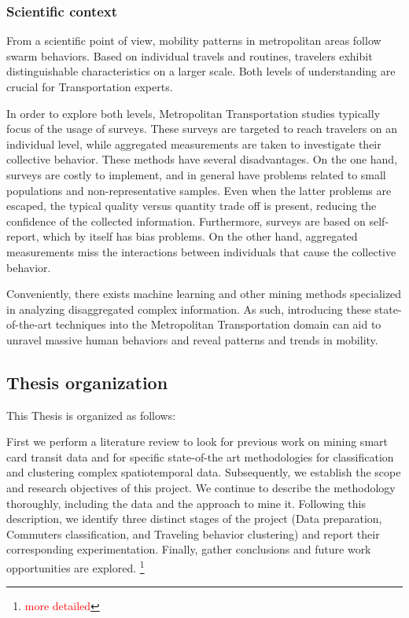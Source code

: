 \documentclass{article}
\newcommand{\selfnote}[1]{\footnote{\textcolor{red}{#1}}}
\begin{document}
\subsubsection{Scientific context}
From a scientific point of view, mobility patterns in metropolitan areas follow swarm behaviors. Based on individual travels and routines, travelers exhibit distinguishable characteristics on a larger scale. Both levels of understanding are crucial for Transportation experts. 

In order to explore both levels, Metropolitan Transportation studies typically focus of the usage of surveys. These surveys are targeted to reach travelers on an individual level, while aggregated measurements are taken to investigate their collective behavior. These methods have several disadvantages. On the one hand, surveys are costly to implement, and in general have problems related to small populations and non-representative samples. Even when the latter problems are escaped, the typical quality versus quantity trade off is present, reducing the confidence of the collected information. Furthermore, surveys are based on self-report, which by itself has bias problems. On the other hand, aggregated measurements miss the interactions between individuals that cause the collective behavior. 

Conveniently, there exists machine learning and other mining methods specialized in analyzing disaggregated complex information. As such, introducing these state-of-the-art techniques into the Metropolitan Transportation domain can aid to unravel massive human behaviors and reveal patterns and trends in mobility.


\subsection{Thesis organization}
This Thesis is organized as follows:

First we perform a literature review to look for previous work on mining smart card transit data and for specific state-of-the art methodologies for classification and clustering complex spatiotemporal data. Subsequently, we establish the scope and research objectives of this project. We continue to describe the methodology thoroughly, including the data and the approach to mine it. Following this description, we identify three distinct stages of the project (Data preparation, Commuters classification, and Traveling behavior clustering) and report their corresponding experimentation. Finally, gather conclusions and future work opportunities are explored. \selfnote{more detailed}
\end{document}
